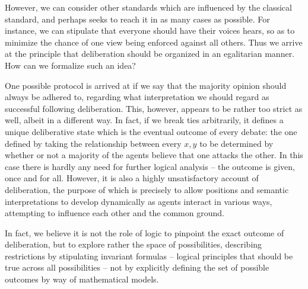 \documentclass{article}
\begin{document}
However, we can consider other standards which are influenced by the classical standard, and perhaps seeks to reach it in as many cases as possible. For instance, we can stipulate that everyone should have their voices hears, so as to minimize the chance of one view being enforced against all others. Thus we arrive at the principle that deliberation should be organized in an egalitarian manner. How can we formalize such an idea?

One possible protocol is arrived at if we say that the majority opinion should always be adhered to, regarding what interpretation we should regard as successful following deliberation. This, however, appears to be rather too strict as well, albeit in a different way. In fact, if we break ties arbitrarily, it defines a unique deliberative state which is the eventual outcome of every debate: the one defined by taking the relationship between every $x,y$ to be determined by whether or not a majority of the agents believe that one attacks the other. In this case there is hardly any need for further logical analysis -- the outcome is given, once and for all. However, it is also a highly unsatisfactory account of deliberation, the purpose of which is precisely to allow positions and semantic interpretations to develop dynamically as agents interact in various ways, attempting to influence each other and the common ground. 

In fact, we believe it is not the role of logic to pinpoint the exact outcome of deliberation, but to explore rather the space of possibilities, describing restrictions by stipulating invariant formulas -- logical principles that should be true across all possibilities -- not by explicitly defining the set of possible outcomes by way of mathematical models.
\end{document}

